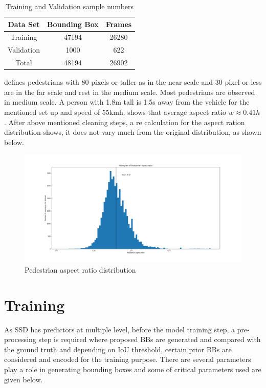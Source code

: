 \begin {table}[H]
\begin{center}
 \begin{tabular}{||c c c||}
 \hline
 Data Set & Bounding Box & Frames\\ [0.8ex] 
 \hline\hline
 Training & 47194 & 26280 \\
 \hline
 Validation & 1000 & 622 \\
 \hline
 Total & 48194 & 26902 \\
 \hline
\end{tabular}
\caption{Training and Validation sample numbers}
\end{center}
\end {table}

\cite{dollar2009pedestrian} defines pedestrians with 80 pixels or taller as in the near scale and 30 pixel or less
are in the far scale and rest in the medium scale. Most pedestrians are observed in medium scale. A person with 1.8m tall is 1.5s away from the vehicle for the mentioned set up and speed of 55km\/h. \cite{dollar2011pedestrian} shows that average aspect ratio \textit{$w \approx 0.41h$}. After above mentioned cleaning steps, a re calculation for the aspect ration distribution shows, it does not vary much from the original distribution, as shown below.

\begin{figure}[H]
\includegraphics[scale=0.4]{aspect_ratio_distribution}
\begin{center}
\caption{Pedestrian aspect ratio distribution}
\end{center}
\end{figure}

\section{Training }
As SSD has predictors at multiple level, before the model training step, a pre-processing step is required where proposed BBs are generated and compared with the ground truth and depending on IoU threshold, certain prior BBs are considered and encoded for the training purpose. There are several parameters play a role in generating bounding boxes and some of critical parameters used are given below.

